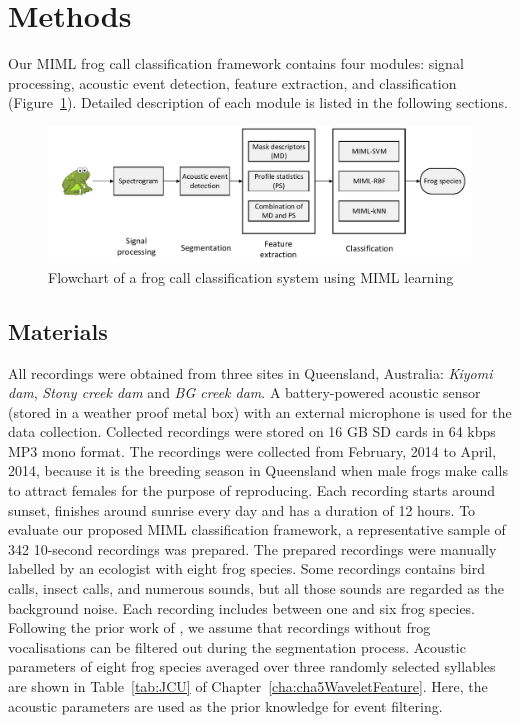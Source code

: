 \section{Methods}
Our MIML frog call classification framework contains four modules: signal processing, acoustic event detection, feature
extraction, and classification (Figure~\ref{fig:flowchart}). Detailed description of each module is listed in the following sections. 

\begin{figure}[htb!]
\centering
\includegraphics[width=\textwidth]{image/Ch6/flowchart.pdf}
\caption{Flowchart of a frog call classification system using MIML learning}
\label{fig:flowchart}
\end{figure}


\subsection{Materials}
\label{chap5:Materials}

All recordings were obtained from three sites in Queensland, Australia: \textit{Kiyomi dam}, \textit{Stony creek dam} and  \textit{BG creek dam}.
A battery-powered acoustic sensor (stored in a weather proof metal box) with an external microphone is used for the data collection. Collected recordings were stored on 16 GB SD cards in 64 kbps MP3 mono format. 
The recordings were collected from February, 2014 to April, 2014, because it is the breeding season in Queensland when male frogs make calls to attract females for the purpose of reproducing. Each recording starts around sunset, finishes around sunrise every day and has a duration of 12 hours. To evaluate our proposed MIML classification framework, a representative sample of 342 10-second recordings was prepared. The prepared recordings were manually labelled by an ecologist with eight frog species. Some recordings contains bird calls, insect calls, and numerous sounds, but all those sounds are regarded as the background noise. Each recording includes between one and six frog species. Following the prior work of \citep{briggs2012acoustic}, we assume that recordings without frog vocalisations can be filtered out during the segmentation process. Acoustic parameters of eight frog species averaged over three randomly selected syllables are shown in Table~\ref{tab:JCU} of Chapter~\ref{cha:cha5WaveletFeature}. Here, the acoustic parameters are used as the prior knowledge for event filtering. 



